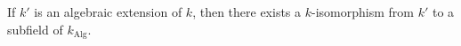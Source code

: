 If $k'$ is an algebraic extension of $k$, then there exists a $k$-isomorphism from $k'$ to a subfield of $k_{\text{Alg}}$.
